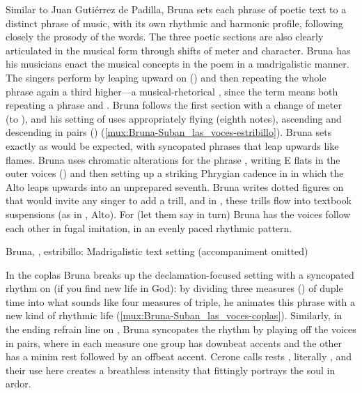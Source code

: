 Similar to Juan Gutiérrez de Padilla, Bruna sets each phrase of poetic text to
a distinct phrase of music, with its own rhythmic and harmonic profile,
following closely the prosody of the words.  
The three poetic sections are also clearly articulated in the musical form
through shifts of meter and character.
Bruna has his musicians enact the musical concepts in the poem in a
madrigalistic manner.  
The singers perform  by leaping upward on
 () and then repeating the whole phrase again a
third higher---a musical-rhetorical , since the term means both
repeating a phrase and .
Bruna follows the first section with a change of meter (to \meterC), and his
setting of  uses appropriately
flying  (eighth notes), ascending and descending in pairs
() (\cref{mux:Bruna-Suban_las_voces-estribillo}).
Bruna sets  exactly as would be expected, with
syncopated phrases that leap upwards like flames.
Bruna uses chromatic alterations for the phrase ,
writing E flats in the outer voices () and then setting up a
striking Phrygian cadence in  in which the Alto leaps upwards
into an unprepared seventh.  
Bruna writes dotted figures on  that would
invite any singer to add a trill, and in , these trills flow
into textbook suspensions (as in , Alto).
For  (let them say in turn) Bruna has the voices follow
each other in fugal imitation, in an evenly paced rhythmic pattern.


{Bruna, , estribillo: Madrigalistic text setting
(accompaniment omitted)}

In the coplas Bruna breaks up the declamation-focused setting with a syncopated
rhythm on  (if you find new life in God):
by dividing three measures () of duple time into what sounds
like four measures of triple, he animates this phrase with a new kind of
rhythmic life (\cref{mux:Bruna-Suban_las_voces-coplas}).
Similarly, in the ending refrain line on , Bruna syncopates the
rhythm by playing off the voices in pairs, where in each measure one group has
downbeat accents and the other has a minim rest followed by an offbeat accent.
Cerone calls rests , literally , and their use
here creates a breathless intensity that fittingly portrays the soul in ardor.%
    \citXXX[Cerone]

